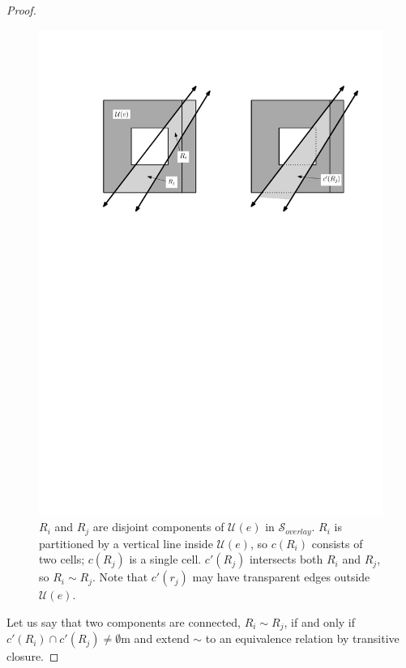 \begin{proof}
\begin{figure}[H]
	\centering
	\includegraphics[width=\textwidth]{figures/disjointcomponents.pdf}
	\caption{$R_i$ and $R_j$ are disjoint components of $\mathcal{U}(e)$ in $\mathcal{S}_{overlay}$.
    		 $R_i$ is partitioned by a vertical line inside $\mathcal{U}(e)$, so $c(R_i)$ consists 
             of two cells; $c(R_j)$ is a single cell. $c'(R_j)$ intersects both $R_i$ and $R_j$, so 
             $R_i \sim R_j$. Note that $c'(r_j)$ may have transparent edges outside $\mathcal{U}(e)$. 
             \cite{HershbergerS99}}
	\label{fig:disjointcomponentsofu}
\end{figure}

Let us say that two components are connected, $R_i \sim R_j$, if and only if
$c'(R_i) \cap c'(R_j) \neq \emptyset$m and extend $\sim$ to an equivalence
relation by transitive closure.


\end{proof}
